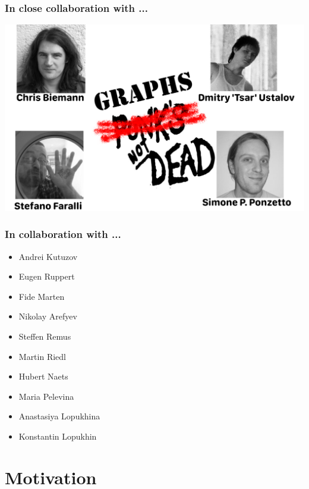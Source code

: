 


\begin{frame}
  \frametitle{In close collaboration with ... }

 \includegraphics[width=.95\textwidth]{figures/collaborators}	
\end{frame}



\begin{frame}
  \frametitle{In collaboration with ... }
  { \large \bf
  \begin{itemize}
  	\item Andrei Kutuzov
  	\item Eugen Ruppert
  	\item Fide Marten
  	\item Nikolay Arefyev
  	\item Steffen Remus
  	\item Martin Riedl
  	\item Hubert Naets
   	\item Maria Pelevina
	\item Anastasiya Lopukhina
	\item Konstantin Lopukhin
  
  \end{itemize}	
  }
\end{frame}


\section{Motivation}





